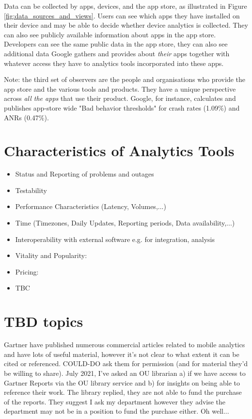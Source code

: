 Data can be collected by apps, devices, and the app store, as illustrated in Figure \ref{fig:data_sources_and_views}. Users can see which apps they have installed on their device and may be able to decide whether device analytics is collected. They can also see publicly available information about apps in the app store. Developers can see the same public data in the app store, they can also see additional data Google gathers and provides about \textit{their} apps together with whatever access they have to analytics tools incorporated into these apps.

Note: the third set of observers are the people and organisations who provide the app store and the various tools and products. They have a unique perspective across \textit{all the apps} that use their product. Google, for instance, calculates and publishes app-store wide "Bad behavior thresholds" for crash rates (1.09\%) and ANRs (0.47\%).

\section{Characteristics of Analytics Tools}


\begin{itemize}
    \item Status and Reporting of problems and outages
    \item Testability
    \item Performance Characteristics (Latency, Volumes,...)
    \item Time (Timezones, Daily Updates, Reporting periods, Data availability,...)
    \item Interoperability with external software e.g. for integration, analysis
    \item Vitality and Popularity: 
    \item Pricing:
    \item TBC
\end{itemize}


\section{TBD topics}
Gartner have published numerous commercial articles related to mobile analytics and have lots of useful material, however it's not clear to what extent it can be cited or referenced. COULD-DO ask them for permission (and for material they'd be willing to share).  July 2021, I've asked an OU librarian a) if we have access to Gartner Reports via the OU library service and b) for insights on being able to reference their work. The library replied, they are not able to fund the purchase of the reports. They suggest I ask my department however they advise the department may not be in a position to fund the purchase either. Oh well...